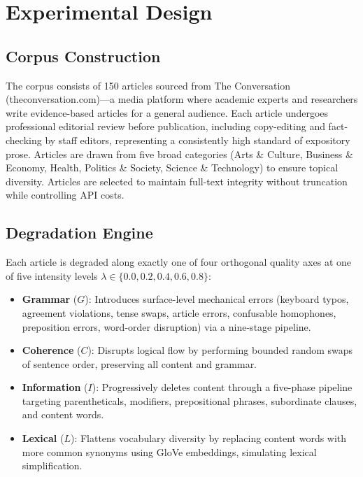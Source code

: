 \documentclass[11pt]{article}
\begin{document}
\section{Experimental Design}
\label{sec:design}

\subsection{Corpus Construction}

The corpus consists of 150 articles sourced from The Conversation (theconversation.com)---a media platform where academic experts and researchers write evidence-based articles for a general audience. Each article undergoes professional editorial review before publication, including copy-editing and fact-checking by staff editors, representing a consistently high standard of expository prose. Articles are drawn from five broad categories (Arts \& Culture, Business \& Economy, Health, Politics \& Society, Science \& Technology) to ensure topical diversity. Articles are selected to maintain full-text integrity without truncation while controlling API costs.

\subsection{Degradation Engine}

Each article is degraded along exactly one of four orthogonal quality axes at one of five intensity levels $\lambda \in \{0.0, 0.2, 0.4, 0.6, 0.8\}$:

\begin{itemize}[nosep]
    \item \textbf{Grammar} ($G$): Introduces surface-level mechanical errors (keyboard typos, agreement violations, tense swaps, article errors, confusable homophones, preposition errors, word-order disruption) via a nine-stage pipeline.
    \item \textbf{Coherence} ($C$): Disrupts logical flow by performing bounded random swaps of sentence order, preserving all content and grammar.
    \item \textbf{Information} ($I$): Progressively deletes content through a five-phase pipeline targeting parentheticals, modifiers, prepositional phrases, subordinate clauses, and content words.
    \item \textbf{Lexical} ($L$): Flattens vocabulary diversity by replacing content words with more common synonyms using GloVe embeddings, simulating lexical simplification.
\end{itemize}
\end{document}
